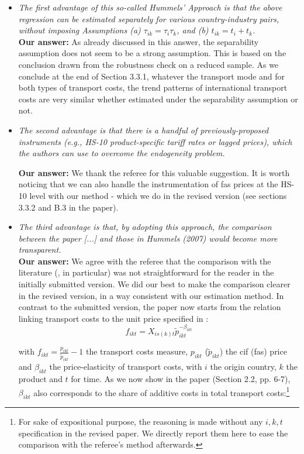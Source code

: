 \documentclass[a4paper,11pt]{article}
\begin{document}
\begin{itemize}
\item \textit{The first advantage of this so-called Hummels' Approach is that the above
regression can be estimated separately for various country-industry pairs, without
imposing Assumptions (a) $\tau_{ik} = \tau_i\tau_{k}$, and (b) $t_{ik} = t_i+ t_{k}$.} \\

\textbf{Our answer:}
As already discussed in this answer, the separability assumption does not seem to be a strong assumption. This is based on the conclusion drawn from the robustness check on a reduced sample. As we conclude at the end of Section 3.3.1, whatever the transport mode and for both types of transport costs, the trend patterns of international transport costs are very similar whether estimated under the separability assumption or not.

\item \textit{The second advantage is that there is a handful of previously-proposed instruments (e.g., HS-10 product-specific tariff rates or lagged prices), which the authors can use to overcome the endogeneity problem.}

     \textbf{Our answer:}
We thank the referee for this valuable suggestion. It is worth noticing that we can also handle the instrumentation of fas prices at the HS-10 level with our method - which we do in the revised version (see sections 3.3.2 and  B.3 in the paper).


\item  \textit{The third advantage is that, by adopting this approach, the comparison between the paper [...] and those in Hummels (2007) would become more transparent.}\\
     \textbf{Our answer:}
     We agree with the referee that the comparison with the literature (\citealp{hummels2007}, in particular) was not straightforward for the reader in the initially submitted version. We did our best to make the comparison clearer in the revised version, in a way consistent with our estimation method. In contrast to the submitted version, the paper now starts from the relation linking transport costs to the unit price specified in \citet{hummels2007}:
    \begin{equation}
    f_{ikt} = X_{is(k)t}\widetilde{p}_{ikt}^{-\beta_{ikt}} \label{eq:Hummels}
    \end{equation}

     with $f_{ikt} = \frac{p_{ikt}}{\widetilde{p}_{ikt}} -1 $ the transport costs measure, $p_{ikt}$ ($\widetilde{p}_{ikt}$) the cif (fas) price and $\beta_{ikt}$ the price-elasticity of transport costs, with $i$ the origin country, $k$ the product and $t$ for time. As we now show in the paper (Section 2.2, pp. 6-7), $\beta_{ikt}$ also corresponds to the share of additive costs in total transport costs:\footnote{For sake of expositional purpose, the reasoning is made without any $i,k,t$ specification in the revised paper. We directly report them here to ease the comparison with the referee's method afterwards.}


\end{itemize}
\end{document}
